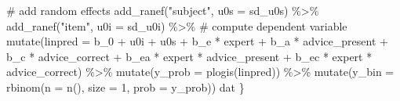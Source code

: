 \documentclass[
  man,
  floatsintext,
  longtable,
  a4paper,
  nolmodern,
  notxfonts,
  notimes,
  colorlinks=true,linkcolor=blue,citecolor=blue,urlcolor=blue]{apa7}
\newenvironment{Shaded}{\begin{snugshade}}{\end{snugshade}}
\newcommand{\AttributeTok}[1]{\textcolor[rgb]{0.40,0.45,0.13}{#1}}
\newcommand{\CommentTok}[1]{\textcolor[rgb]{0.37,0.37,0.37}{#1}}
\newcommand{\DecValTok}[1]{\textcolor[rgb]{0.68,0.00,0.00}{#1}}
\newcommand{\FunctionTok}[1]{\textcolor[rgb]{0.28,0.35,0.67}{#1}}
\newcommand{\NormalTok}[1]{\textcolor[rgb]{0.00,0.23,0.31}{#1}}
\newcommand{\SpecialCharTok}[1]{\textcolor[rgb]{0.37,0.37,0.37}{#1}}
\newcommand{\StringTok}[1]{\textcolor[rgb]{0.13,0.47,0.30}{#1}}
\begin{document}
\begin{Shaded}
\begin{Highlighting}[]
    \CommentTok{\# add random effects}
    \FunctionTok{add\_ranef}\NormalTok{(}\StringTok{"subject"}\NormalTok{, }\AttributeTok{u0s =}\NormalTok{ sd\_u0s) }\SpecialCharTok{\%\textgreater{}\%}
    \FunctionTok{add\_ranef}\NormalTok{(}\StringTok{"item"}\NormalTok{, }\AttributeTok{u0i =}\NormalTok{ sd\_u0i) }\SpecialCharTok{\%\textgreater{}\%}
    \CommentTok{\# compute dependent variable}
    \FunctionTok{mutate}\NormalTok{(}\AttributeTok{linpred =}\NormalTok{ b\_0 }\SpecialCharTok{+}\NormalTok{ u0i }\SpecialCharTok{+}\NormalTok{ u0s }\SpecialCharTok{+}
\NormalTok{      b\_e }\SpecialCharTok{*}\NormalTok{ expert }\SpecialCharTok{+}\NormalTok{ b\_a }\SpecialCharTok{*}\NormalTok{ advice\_present }\SpecialCharTok{+}\NormalTok{ b\_c }\SpecialCharTok{*}\NormalTok{ advice\_correct }\SpecialCharTok{+}
\NormalTok{      b\_ea }\SpecialCharTok{*}\NormalTok{ expert }\SpecialCharTok{*}\NormalTok{ advice\_present }\SpecialCharTok{+}\NormalTok{ b\_ec }\SpecialCharTok{*}\NormalTok{ expert }\SpecialCharTok{*}\NormalTok{ advice\_correct) }\SpecialCharTok{\%\textgreater{}\%}
    \FunctionTok{mutate}\NormalTok{(}\AttributeTok{y\_prob =} \FunctionTok{plogis}\NormalTok{(linpred)) }\SpecialCharTok{\%\textgreater{}\%}
    \FunctionTok{mutate}\NormalTok{(}\AttributeTok{y\_bin =} \FunctionTok{rbinom}\NormalTok{(}\AttributeTok{n =} \FunctionTok{n}\NormalTok{(), }\AttributeTok{size =} \DecValTok{1}\NormalTok{, }\AttributeTok{prob =}\NormalTok{ y\_prob))}
\NormalTok{  dat}
\NormalTok{\}}
\end{Highlighting}
\end{Shaded}
\end{document}
